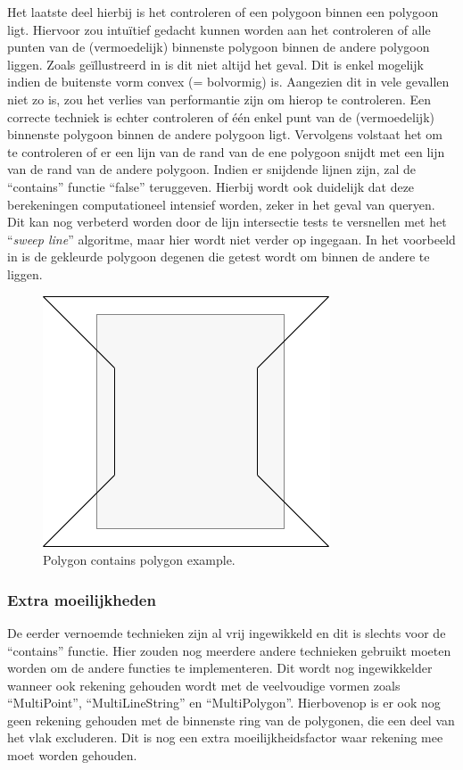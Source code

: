 Het laatste deel hierbij is het controleren of een polygoon binnen een polygoon ligt. Hiervoor zou intuïtief gedacht kunnen worden aan het controleren of alle punten van de (vermoedelijk) binnenste polygoon binnen de andere polygoon liggen. Zoals geïllustreerd in  is dit niet altijd het geval. Dit is enkel mogelijk indien de buitenste vorm convex (= bolvormig) is. Aangezien dit in vele gevallen niet zo is, zou het verlies van performantie zijn om hierop te controleren. Een correcte techniek is echter controleren of één enkel punt van de (vermoedelijk) binnenste polygoon binnen de andere polygoon ligt. Vervolgens volstaat het om te controleren of er een lijn van de rand van de ene polygoon snijdt met een lijn van de rand van de andere polygoon. Indien er snijdende lijnen zijn, zal de ``contains'' functie ``false'' teruggeven. Hierbij wordt ook duidelijk dat deze berekeningen computationeel intensief worden, zeker in het geval van queryen. Dit kan nog verbeterd worden door de lijn intersectie tests te versnellen met het ``\textit{sweep line}'' algoritme, maar hier wordt niet verder op ingegaan. In het voorbeeld in  is de gekleurde polygoon degenen die getest wordt om binnen de andere te liggen.

\begin{figure}
    \centering
    \includegraphics[width=0.3\linewidth]{images/polygon_contains_polygon.png}
    \caption{Polygon contains polygon example.}
    \label{fig:polygon_contains_polygon}
\end{figure}


\subsubsection{Extra moeilijkheden}
De eerder vernoemde technieken zijn al vrij ingewikkeld en dit is slechts voor de ``contains'' functie. Hier zouden nog meerdere andere technieken gebruikt moeten worden om de andere functies te implementeren. Dit wordt nog ingewikkelder wanneer ook rekening gehouden wordt met de veelvoudige vormen zoals ``MultiPoint'', ``MultiLineString'' en ``MultiPolygon''. Hierbovenop is er ook nog geen rekening gehouden met de binnenste ring van de polygonen, die een deel van het vlak excluderen. Dit is nog een extra moeilijkheidsfactor waar rekening mee moet worden gehouden.  

